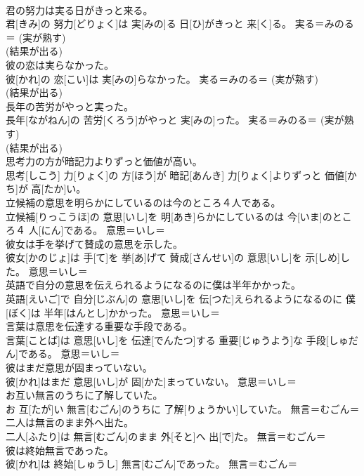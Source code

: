 \documentclass[8pt]{extreport}
\begin{document}
\begin{CJK}{UTF8}{min}
{\\	君の努力は実る日がきっと来る。	
\\	君[きみ]の 努力[どりょく]は 実[みの]る 日[ひ]がきっと 来[く]る。	実る＝みのる＝ (実が熟す) 
\\	(結果が出る) 
\\	彼の恋は実らなかった。	
\\	彼[かれ]の 恋[こい]は 実[みの]らなかった。	実る＝みのる＝ (実が熟す) 
\\	(結果が出る) 
\\	長年の苦労がやっと実った。	
\\	長年[ながねん]の 苦労[くろう]がやっと 実[みの]った。	実る＝みのる＝ (実が熟す) 
\\	(結果が出る) 
\\	思考力の方が暗記力よりずっと価値が高い。	
\\	思考[しこう] 力[りょく]の 方[ほう]が 暗記[あんき] 力[りょく]よりずっと 価値[かち]が 高[たか]い。	
\\	立候補の意思を明らかにしているのは今のところ４人である。	
\\	立候補[りっこうほ]の 意思[いし]を 明[あき]らかにしているのは 今[いま]のところ４ 人[にん]である。	意思＝いし＝ 
\\	彼女は手を挙げて賛成の意思を示した。	
\\	彼女[かのじょ]は 手[て]を 挙[あ]げて 賛成[さんせい]の 意思[いし]を 示[しめ]した。	意思＝いし＝ 
\\	英語で自分の意思を伝えられるようになるのに僕は半年かかった。	
\\	英語[えいご]で 自分[じぶん]の 意思[いし]を 伝[つた]えられるようになるのに 僕[ぼく]は 半年[はんとし]かかった。	意思＝いし＝ 
\\	言葉は意思を伝達する重要な手段である。	
\\	言葉[ことば]は 意思[いし]を 伝達[でんたつ]する 重要[じゅうよう]な 手段[しゅだん]である。	意思＝いし＝ 
\\	彼はまだ意思が固まっていない。	
\\	彼[かれ]はまだ 意思[いし]が 固[かた]まっていない。	意思＝いし＝ 
\\	お互い無言のうちに了解していた。	
\\	お 互[たが]い 無言[むごん]のうちに 了解[りょうかい]していた。	無言＝むごん＝ 
\\	二人は無言のまま外へ出た。	
\\	二人[ふたり]は 無言[むごん]のまま 外[そと]へ 出[で]た。	無言＝むごん＝ 
\\	彼は終始無言であった。	
\\	彼[かれ]は 終始[しゅうし] 無言[むごん]であった。	無言＝むごん＝ 
}
\end{CJK}
\end{document}
